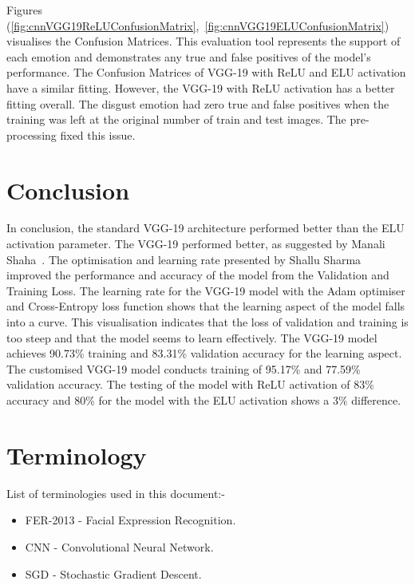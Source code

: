 \documentclass[conference]{IEEEtran}
\begin{document}
      Figures (\ref{fig:cnnVGG19ReLUConfusionMatrix},~\ref{fig:cnnVGG19ELUConfusionMatrix}) visualises the Confusion Matrices. This evaluation tool represents the support of each emotion and demonstrates any true and false positives of the model's performance. The Confusion Matrices of VGG-19 with ReLU and ELU activation have a similar fitting. However, the VGG-19 with ReLU activation has a better fitting overall. The disgust emotion had zero true and false positives when the training was left at the original number of train and test images. The pre-processing fixed this issue.

    \section{Conclusion}
      In conclusion, the standard VGG-19 architecture performed better than the ELU activation parameter. The VGG-19 performed better, as suggested by Manali Shaha~\cite{shaha_transfer_2018}. The optimisation and learning rate presented by Shallu Sharma~\cite{sharma_optimised_2021} improved the performance and accuracy of the model from the Validation and Training Loss. The learning rate for the VGG-19 model with the Adam optimiser and Cross-Entropy loss function shows that the learning aspect of the model falls into a curve. This visualisation indicates that the loss of validation and training is too steep and that the model seems to learn effectively. The VGG-19 model achieves 90.73\% training and 83.31\% validation accuracy for the learning aspect. The customised VGG-19 model conducts training of 95.17\% and 77.59\% validation accuracy. The testing of the model with ReLU activation of 83\% accuracy and 80\% for the model with the ELU activation shows a 3\% difference.

    \section{Terminology}
      List of terminologies used in this document:-
      \begin{itemize}
        \item FER-2013 - Facial Expression Recognition.
        \item CNN - Convolutional Neural Network.
        \item SGD - Stochastic Gradient Descent.
      \end{itemize}
    
	\renewcommand\refname{\section{Reference List}}
	\small{
    }
\end{document}
